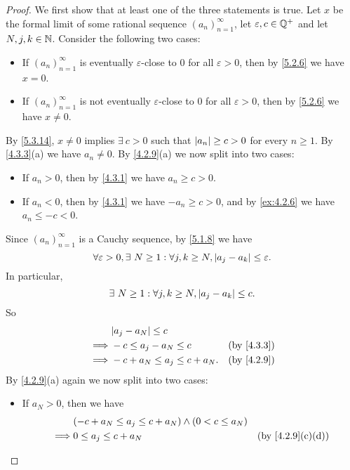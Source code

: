 \begin{proof}
  We first show that at least one of the three statements is true.
  Let \(x\) be the formal limit of some rational sequence \((a_n)_{n = 1}^{\infty}\), let \(\varepsilon, c \in \mathbb{Q}^+\) and let \(N, j, k \in \mathbb{N}\).
  Consider the following two cases:
  \begin{itemize}
    \item If \((a_n)_{n = 1}^{\infty}\) is eventually \(\varepsilon\)-close to \(0\) for all \(\varepsilon > 0\), then by \cref{5.2.6} we have \(x = 0\).
    \item If \((a_n)_{n = 1}^{\infty}\) is not eventually \(\varepsilon\)-close to \(0\) for all \(\varepsilon > 0\), then by \cref{5.2.6} we have \(x \neq 0\).
  \end{itemize}
  By \cref{5.3.14}, \(x \neq 0\) implies \(\exists\ c > 0\) such that \(\left\lvert a_n\right\rvert \geq c > 0\) for every \(n \geq 1\).
  By \cref{4.3.3}(a) we have \(a_n \neq 0\).
  By \cref{4.2.9}(a) we now split into two cases:
  \begin{itemize}
    \item If \(a_n > 0\), then by \cref{4.3.1} we have \(a_n \geq c > 0\).
    \item If \(a_n < 0\), then by \cref{4.3.1} we have \(-a_n \geq c > 0\), and by \cref{ex:4.2.6} we have \(a_n \leq -c < 0\).
  \end{itemize}
  Since \((a_n)_{n = 1}^{\infty}\) is a Cauchy sequence, by \cref{5.1.8} we have
  \[
    \forall \varepsilon > 0, \exists\ N \geq 1 : \forall j, k \geq N, \left\lvert a_j - a_k\right\rvert \leq \varepsilon.
  \]
  In particular,
  \[
    \exists\ N \geq 1 : \forall j, k \geq N, \left\lvert a_j - a_k\right\rvert \leq c.
  \]
  So
  \begin{align*}
             & \abs{a_j - a_N} \leq c                                     \\
    \implies & -c \leq a_j - a_N \leq c        & \text{(by \cref{4.3.3})} \\
    \implies & -c + a_N \leq a_j \leq c + a_N. & \text{(by \cref{4.2.9})} \\
  \end{align*}
  By \cref{4.2.9}(a) again we now split into two cases:
  \begin{itemize}
    \item If \(a_N > 0\), then we have
          \begin{align*}
                     & (-c + a_N \leq a_j \leq c + a_N) \land (0 < c \leq a_N)                                  \\
            \implies & 0 \leq a_j \leq c + a_N                                 & \text{(by \cref{4.2.9}(c)(d))} \\

\end{align*}
\end{itemize}
\end{proof}
